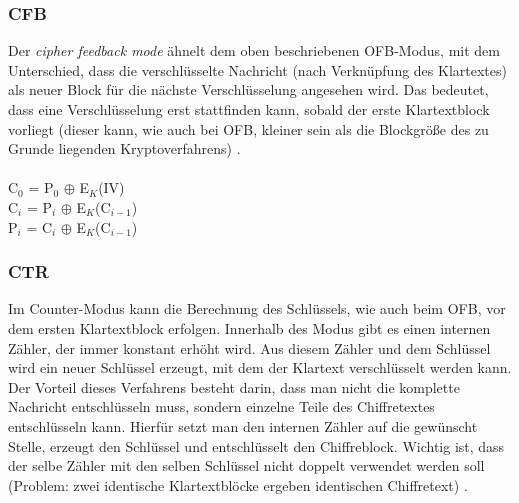 \documentclass[10pt, a4paper,headsepline]{scrreprt}
\begin{document}
\subsubsection{CFB}
Der \textit{cipher feedback mode} ähnelt dem oben beschriebenen OFB-Modus, mit dem Unterschied, dass die verschlüsselte Nachricht (nach Verknüpfung des Klartextes) als neuer Block für die nächste Verschlüsselung angesehen wird. Das bedeutet, dass eine Verschlüsselung erst stattfinden kann, sobald der erste Klartextblock vorliegt (dieser kann, wie auch bei OFB, kleiner sein als die Blockgröße des zu Grunde liegenden Kryptoverfahrens)  \citep[S. 235ff]{book:angewandte-krypto}. \\ \\
C$_{0}$ = P$_{0}$ $\oplus$ E$_{K}$(IV) \\
C$_{i}$ = P$_{i}$ $\oplus$ E$_{K}$(C$_{i-1}$) \\
P$_{i}$ = C$_{i}$ $\oplus$ E$_{K}$(C$_{i-1}$) \\

\subsubsection{CTR}
Im Counter-Modus kann die Berechnung des Schlüssels, wie auch beim OFB, vor dem ersten Klartextblock erfolgen. Innerhalb des Modus gibt es einen internen Zähler, der immer konstant erhöht wird. Aus diesem Zähler und dem Schlüssel wird ein neuer Schlüssel erzeugt, mit dem der Klartext verschlüsselt werden kann. Der Vorteil dieses Verfahrens besteht darin, dass man nicht die komplette Nachricht entschlüsseln muss, sondern einzelne Teile des Chiffretextes entschlüsseln kann. Hierfür setzt man den internen Zähler auf die gewünscht Stelle, erzeugt den Schlüssel und entschlüsselt den Chiffreblock. Wichtig ist, dass der selbe Zähler mit den selben Schlüssel nicht doppelt verwendet werden soll (Problem: zwei identische Klartextblöcke ergeben identischen Chiffretext) \citep[S. 243]{book:angewandte-krypto}.
\end{document}
